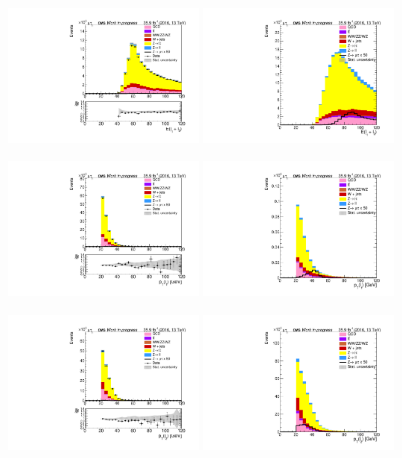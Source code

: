 \begin{figure}[htp]
	\includegraphics[width=0.45\textwidth]{plots/mt/EnergySum_CR.pdf}
	\includegraphics[width=0.45\textwidth]{plots/mt/EnergySum_withsignal.pdf}

	\includegraphics[width=0.45\textwidth]{plots/mt/TransverseMomentum1_CR.pdf}
	\includegraphics[width=0.45\textwidth]{plots/mt/TransverseMomentum1_withsignal.pdf}

	\includegraphics[width=0.45\textwidth]{plots/mt/TransverseMomentum2_CR.pdf}
	\includegraphics[width=0.45\textwidth]{plots/mt/TransverseMomentum2_withsignal.pdf}
\end{figure}


